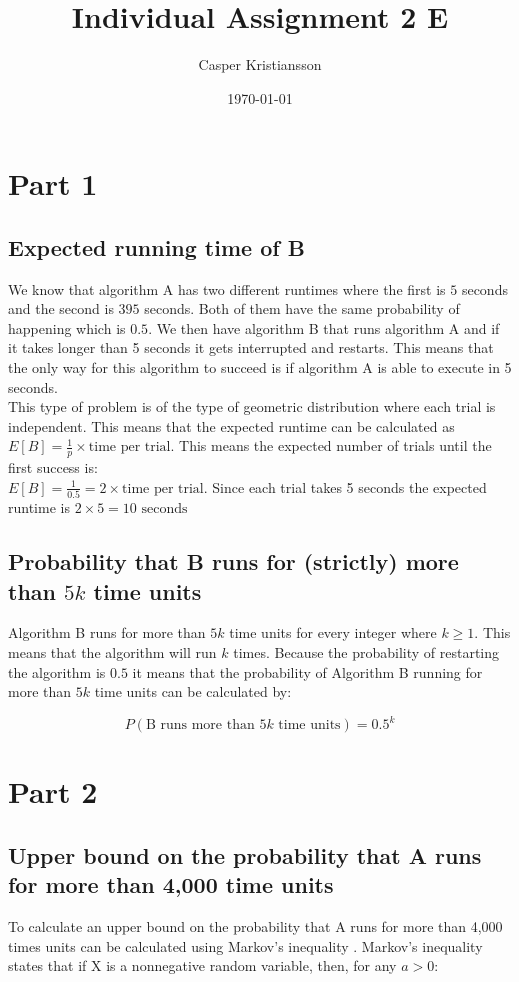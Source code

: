 \documentclass{article}
\title{Individual Assignment 2 E}
\author{Casper Kristiansson}
\date{\today}
\begin{document}
\maketitle

\section{Part 1}
\subsection{Expected running time of B}
We know that algorithm A has two different runtimes where the first is \(5\) seconds and the second is \(395\) seconds. Both of them have the same probability of happening which is \(0.5\). We then have algorithm B that runs algorithm A and if it takes longer than 5 seconds it gets interrupted and restarts. This means that the only way for this algorithm to succeed is if algorithm A is able to execute in 5 seconds. \\

 \noindent This type of problem is of the type of geometric distribution where each trial is independent. This means that the expected runtime can be calculated as \(E[B] = \frac{1}{p} \times \text{time per trial} \). This means the expected number of trials until the first success is: \\

 \noindent \(E[B] = \frac{1}{0.5} = 2 \times \text{time per trial.}\) Since each trial takes 5 seconds the expected runtime is \(2 \times 5 = 10 \text{ seconds}\)

\subsection{Probability that B runs for (strictly) more than \(5k\) time units}
Algorithm B runs for more than \(5k\) time units for every integer where \(k \geq 1\). This means that the algorithm will run \(k\) times. Because the probability of restarting the algorithm is \(0.5\) it means that the probability of Algorithm B running for more than \(5k\) time units can be calculated by:

\[P(\text{B runs more than } 5k \text{ time units}) = 0.5^k\]


\section{Part 2}
\subsection{Upper bound on the probability that A runs for more than 4,000 time units}
To calculate an upper bound on the probability that A runs for more than 4,000 times units can be calculated using Markov's inequality \cite{Lecture6}. Markov's inequality states that if X is a nonnegative random variable, then, for any \(a > 0\):
\end{document}

